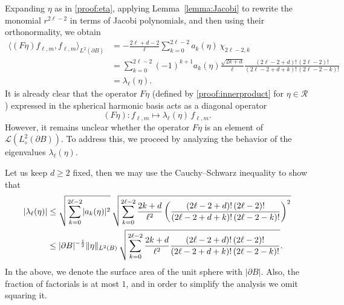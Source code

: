 \documentclass[reqno]{amsart}
\numberwithin{equation}{section}
\numberwithin{figure}{section}
\numberwithin{table}{section}
\theoremstyle{plain}
\theoremstyle{definition}
\theoremstyle{remark}
\newcommand{\abs}[1]{\lvert#1\rvert}
\newcommand{\inner}[1]{\langle#1\rangle}
\newcommand{\sphe}{{\partial B}}
\begin{document}
Expanding \( \eta \) as in \eqref{proof:eta}, applying Lemma~\ref{lemma:Jacobi} to rewrite the monomial \( r^{2 \ell - 2} \) in terms of Jacobi polynomials, and then using their orthonormality, we obtain
%
\begin{align*}
    \inner{(F \eta) f_{\ell, m}, f_{\ell, m}}_{L^2(\sphe)} &= - \frac{2 \ell + d - 2}{\ell} \sum^{2 \ell - 2}_{k=0} a_k(\eta) \, \chi_{2 \ell - 2, k} \\
    &= \sum^{2 \ell - 2}_{k=0} (-1)^{k+1} a_k(\eta) \frac{\sqrt{2k+d}}{\ell} \frac{(2\ell-2+d)! \, (2\ell-2)!}{(2\ell-2+d+k)! \, (2\ell-2-k)!} \\
    &= \lambda_\ell(\eta).
\end{align*}
%
It is already clear that the operator \( F \eta \) (defined by \eqref{proof:innerproduct} for \( \eta \in \mathcal{R} \)) expressed in the spherical harmonic basis acts as a diagonal operator
%
\begin{equation} \label{proof:diagonal}
    (F \eta) : f_{\ell, m} \mapsto \lambda_\ell(\eta) \, f_{\ell, m}.
\end{equation}
%
However, it remains unclear whether the operator \( F \eta \) is an element of \( \mathscr{L}(L^2_\diamond(\sphe)) \). 
%
To address this, we proceed by analyzing the behavior of the eigenvalues \( \lambda_\ell(\eta) \).
%


Let us keep \( d \geq 2 \) fixed, then we may use the Cauchy–Schwarz inequality to show that
%
\begin{align} \label{proof:proof_up1}
    \abs{\lambda_\ell(\eta)} &\leq \sqrt{\sum^{2 \ell - 2}_{k=0} \abs{a_k(\eta)}^2} \, \sqrt{\sum^{2\ell-2}_{k=0} \frac{2 k+d}{\ell^2} \left( \frac{(2\ell-2+d)! \, (2\ell-2)!}{(2\ell-2+d+k)! \, (2\ell-2-k)!} \right)^2} \notag \\
    &\leq \abs{\sphe}^{-\frac{1}{2}} \| \eta \|_{L^2(B)} \, \sqrt{\sum^{2\ell-2}_{k=0} \frac{2 k+d}{\ell^2} \frac{(2\ell-2+d)! \, (2\ell-2)!}{(2\ell-2+d+k)! \, (2\ell-2-k)!}}.
\end{align}
%
In the above, we denote the surface area of the unit sphere with \( \abs{\sphe} \). Also, the fraction of factorials is at most \( 1 \), and in order to simplify the analysis we omit squaring it.
%
\end{document}
